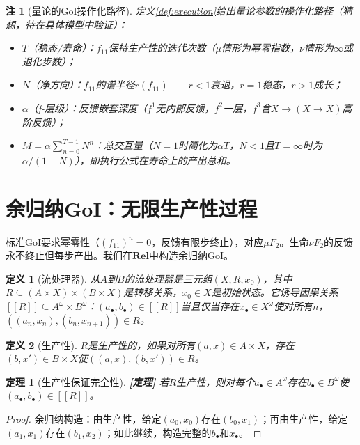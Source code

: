 \documentclass[11pt,a4paper]{article}
\newtheorem{definition}{定义}
\newtheorem{theorem}{定理}
\newtheorem{remark}{注}
\newcommand{\lvl}[1]{\hfill\textbf{\footnotesize[#1]}}
\newcommand{\lvP}{\lvl{定理}}
\begin{document}
\begin{remark}[量论的GoI操作化路径]\label{rmk:measure-goi}
定义\ref{def:execution}给出量论参数的操作化路径（猜想，待在具体模型中验证）：
\begin{itemize}
  \item $T$（稳态/寿命）：$f_{11}$保持生产性的迭代次数（$\mu$情形为幂零指数，$\nu$情形为$\infty$或退化步数）；
  \item $N$（净方向）：$f_{11}$的谱半径$r(f_{11})$——$r<1$衰退，$r=1$稳态，$r>1$成长；
  \item $\alpha$（f-层级）：反馈嵌套深度（$f^1$无内部反馈，$f^2$一层，$f^3$含$X\to(X\to X)$高阶反馈）；
  \item $M=\alpha\sum_{n=0}^{T-1}N^n$：总交互量（$N=1$时简化为$\alpha T$，$N<1$且$T=\infty$时为$\alpha/(1-N)$），即执行公式在寿命上的产出总和。
\end{itemize}
\end{remark}

\section{余归纳GoI：无限生产性过程}

标准GoI要求幂零性（$(f_{11})^n=0$，反馈有限步终止），对应$\mu F_2$。生命$\nu F_2$的反馈永不终止但每步产出。我们在$\mathbf{Rel}$中构造余归纳GoI。

\begin{definition}[流处理器]\label{def:stream-processor}
从$A$到$B$的流处理器是三元组$(X,R,x_0)$，其中$R\subseteq(A\times X)\times(B\times X)$是转移关系，$x_0\in X$是初始状态。它诱导因果关系$[\![ R]\!]\subseteq A^\omega\times B^\omega$：$(a_\bullet,b_\bullet)\in[\![ R]\!]$当且仅当存在$x_\bullet\in X^\omega$使对所有$n$，$((a_n,x_n),(b_n,x_{n+1}))\in R$。
\end{definition}

\begin{definition}[生产性]\label{def:productivity}
$R$是生产性的，如果对所有$(a,x)\in A\times X$，存在$(b,x')\in B\times X$使$((a,x),(b,x'))\in R$。
\end{definition}

\begin{theorem}[生产性保证完全性]\label{thm:productivity-totality}\lvP
若$R$生产性，则对每个$a_\bullet\in A^\omega$存在$b_\bullet\in B^\omega$使$(a_\bullet,b_\bullet)\in[\![ R]\!]$。
\end{theorem}

\begin{proof}
余归纳构造：由生产性，给定$(a_0,x_0)$存在$(b_0,x_1)$；再由生产性，给定$(a_1,x_1)$存在$(b_1,x_2)$；如此继续，构造完整的$b_\bullet$和$x_\bullet$。
\end{proof}
\end{document}
